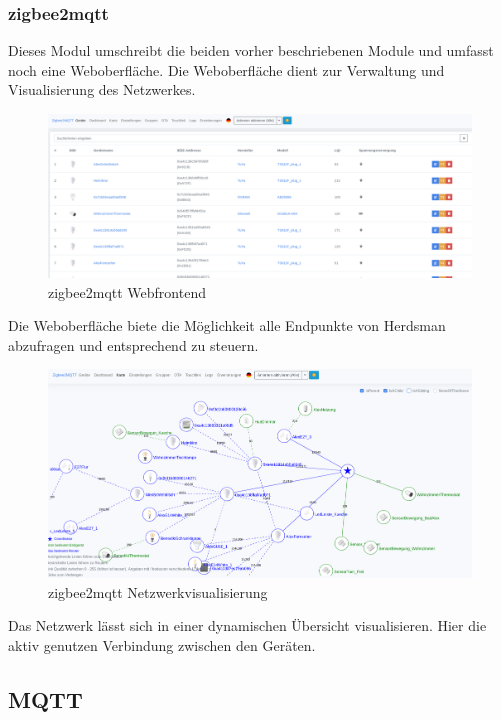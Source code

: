 \subsubsection{zigbee2mqtt}

Dieses Modul umschreibt die beiden vorher beschriebenen Module und umfasst noch eine Weboberfläche. Die Weboberfläche dient zur Verwaltung und Visualisierung des Netzwerkes.
\begin{figure}[H]
  \centering
  \includegraphics[width=1\textwidth]{media/z2m.png}
  \caption{zigbee2mqtt Webfrontend}
\end{figure}

Die Weboberfläche biete die Möglichkeit alle Endpunkte von Herdsman abzufragen und entsprechend zu steuern.

\begin{figure}[H]
  \centering
  \includegraphics[width=1\textwidth]{media/z2m-map.png}
  \caption{zigbee2mqtt Netzwerkvisualisierung}
\end{figure}

Das Netzwerk lässt sich in einer dynamischen Übersicht visualisieren. Hier die aktiv genutzen Verbindung zwischen den Geräten. 

\subsection{MQTT}

